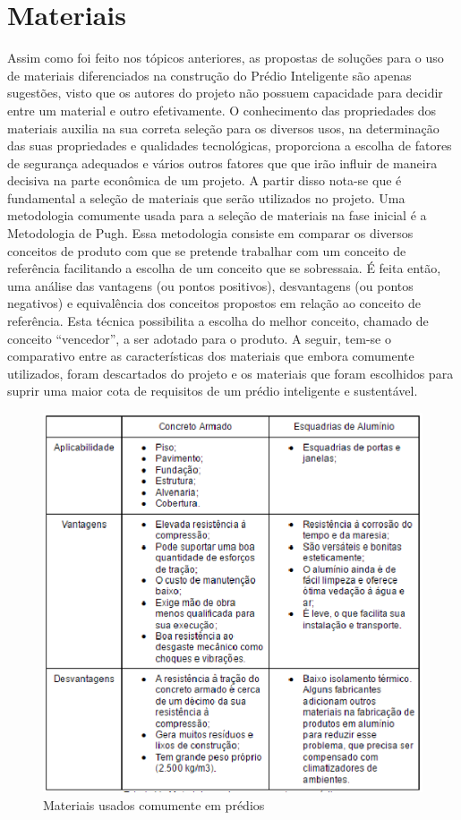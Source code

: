 \section{Materiais}
Assim como foi feito nos tópicos anteriores, as propostas de soluções para o uso de materiais diferenciados na construção do Prédio Inteligente são apenas sugestões, visto que os autores do projeto não possuem capacidade para decidir entre um material e outro efetivamente. O conhecimento das propriedades dos materiais auxilia na sua correta seleção para os diversos usos, na determinação das suas propriedades e qualidades tecnológicas, proporciona a escolha de fatores de segurança adequados e vários outros fatores que que irão influir de maneira decisiva na parte econômica de um projeto.
A partir disso nota-se que é fundamental a seleção de materiais que serão utilizados no projeto. Uma metodologia comumente usada para a seleção de materiais na fase inicial é a Metodologia de Pugh. Essa metodologia consiste em comparar os diversos conceitos de produto com que se pretende trabalhar com um conceito de referência facilitando a escolha de um conceito que se sobressaia.
É feita então, uma análise das vantagens (ou pontos positivos), desvantagens (ou pontos negativos) e equivalência dos conceitos propostos em relação ao conceito de referência. Esta técnica possibilita a escolha do melhor conceito, chamado de conceito “vencedor”, a ser adotado para o produto. A seguir, tem-se o comparativo entre as características dos materiais que embora comumente utilizados, foram descartados do projeto e os materiais que foram escolhidos para suprir uma maior cota de requisitos de um prédio inteligente e sustentável.

\begin{figure}[!ht]
\centering
\includegraphics[keepaspectratio=true,scale=1]{figuras/materiais_usados_comumente_em_predios.eps}
\caption{Materiais usados comumente em prédios}
\end{figure}

